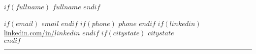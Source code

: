 \begin{center}
$if(fullname)$
{\fontsize{18}{0}\selectfont\scshape $fullname$ \vspace{-0.1in}}
$endif$
\end{center}
\begin{center}
$if(email)$
\href{mailto: $email$}{\faEnvelope\enspace $email$}\hfill
$endif$
$if(phone)$
\href{tel: $phone$}{\faPhone\enspace $phone$}\hfill
$endif$
$if(linkedin)$
\href{https://linkedin.com/in/$linkedin$}{\faLinkedinIn\enspace linkedin.com/in/$linkedin$}\hfill
$endif$
$if(citystate)$
\faMapMarker\enspace $citystate$\\
$endif$
\noindent\rule{7.5in}{0.4pt}
\end{center}
\renewcommand{\labelitemi}{-}